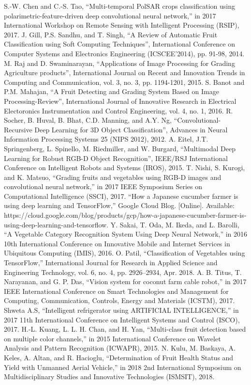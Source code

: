 \documentclass[conference]{IEEEtran}
\begin{document}
\begin{thebibliography}{00}
		 S.-W. Chen and C.-S. Tao, ``Multi-temporal PolSAR crops classification using polarimetric-feature-driven deep convolutional neural network,'' in 2017 International Workshop on Remote Sensing with Intelligent Processing (RSIP), 2017.
		 J. Gill, P.S. Sandhu, and T. Singh, ``A Review of Automatic Fruit Classification using Soft Computing Techniques'', International Conference on Computer Systems and Electronics Engineering (ICSCEE'2014), pp. 91-98, 2014.
		 M. Raj and D. Swaminarayan, ``Applications of Image Processing for Grading Agriculture products'', International Journal on Recent and Innovation Trends in Computing and Communication, vol. 3, no. 3, pp. 1194-1201, 2015.
		 S. Banot and P.M. Mahajan, ``A Fruit Detecting and Grading System Based on Image Processing-Review'', International Journal of Innovative Research in Electrical Electoronics Instrumentation and Control Engineering, vol. 4, no. 1, 2016.
		 R. Socher, B. Huval, B. Bhat, C.D. Manning, and A.Y. Ng, ``Convolutional-Recursive Deep Learning for 3D Object Classification'', Advances in Neural Information Processing Systems 25 (NIPS 2012), 2012.
		 A. Eitel, J.T. Springenberg, L. Spinello, M. Riedmiller, and W. Burgard, ``Multimodal Deep Learning for Robust RGB-D Object Recognition'', IEEE/RSJ International Conference on Intelligent Robots and Systems (IROS), 2015.
		 T. Nishi, S. Kurogi, and K. Matsuo, ``Grading fruits and vegetables using RGB-D images and convolutional neural network,'' in 2017 IEEE Symposium Series on Computational Intelligence (SSCI), 2017.
		 ``How a Japanese cucumber farmer is using deep learning and TensorFlow,'' Google Cloud Blog. [Online]. Available: https://cloud.google.com/blog/products/gcp/how-a-japanese-cucumber-farmer-is-using-deep-learning-and-tensorflow.
		 Y. Sakai, T. Oda, M. Ikeda, and L. Barolli, ``A Vegetable Category Recognition System Using Deep Neural Network,'' in 2016 10th International Conference on Innovative Mobile and Internet Services in Ubiquitous Computing (IMIS), 2016.
		 O. Patil, ``Classification of Vegetables using TensorFlow,'' International Journal for Research in Applied Science and Engineering Technology, vol. 6, no. 4, pp. 2926–2934, Apr. 2018.
		 A. B. Titus, T. Narayanan, and G. P. Das, ``Vision system for coconut farm cable robot,'' in 2017 IEEE International Conference on Smart Technologies and Management for Computing, Communication, Controls, Energy and Materials (ICSTM), 2017.
		 Shweta A.S, ``Intelligent refrigerator using ARTIFICIAL INTELLIGENCE,'' in 2017 11th International Conference on Intelligent Systems and Control (ISCO), 2017.
		 H.-L. Kuang, L. L. H. Chan, and H. Yan, ``Multi-class fruit detection based on multiple color channels,'' in 2015 International Conference on Wavelet Analysis and Pattern Recognition (ICWAPR), 2015.
		 N. Kulu, M. Baskaya, A. Keles, A. Altan, and R. Hacioglu, ``Determination of Fruit Health Status and Yield with Unmanned Aerial Vehicle,'' in 2018 2nd International Symposium on Multidisciplinary Studies and Innovative Technologies (ISMSIT), 2018.
	\end{thebibliography}
\end{document}
